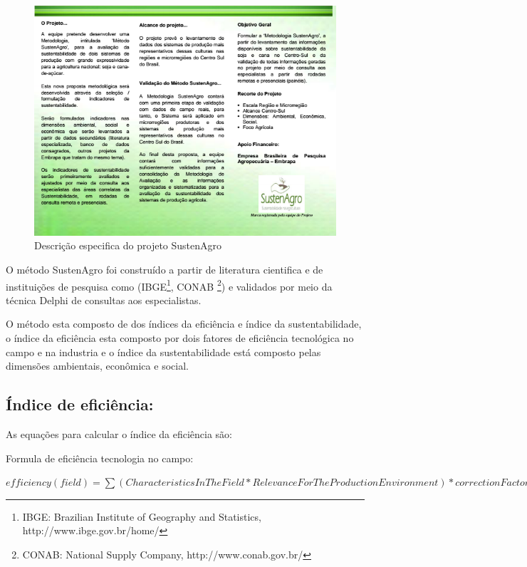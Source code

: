 \begin{figure}[H]
\begin{centering}
\includegraphics[width=1\columnwidth]{figures/folderEmbrapa2}
\par\end{centering}
\caption{Descrição especifica do projeto SustenAgro \label{fig:SustenAgro_Details}}
\end{figure}

O método SustenAgro foi construído a partir de literatura cientifica
e de instituições de pesquisa como (IBGE\footnote{IBGE: Brazilian Institute of Geography and Statistics, http://www.ibge.gov.br/home/},
CONAB \footnote{CONAB: National Supply Company, http://www.conab.gov.br/})
e validados por meio da técnica Delphi de consultas aos especialistas.

O método esta composto de dos índices da eficiência e índice da sustentabilidade,
o índice da eficiência esta composto por dois fatores de eficiência
tecnológica no campo e na industria e o índice da sustentabilidade
está composto pelas dimensões ambientais, econômica e social.

\subsection*{Índice de eficiência:}

As equações para calcular o índice da eficiência são:

Formula de eficiência tecnologia no campo:

$efficiency(field)=\sum(CharacteristicsInTheField*RelevanceForTheProductionEnvironment)*correctionFactor(0.8)$

